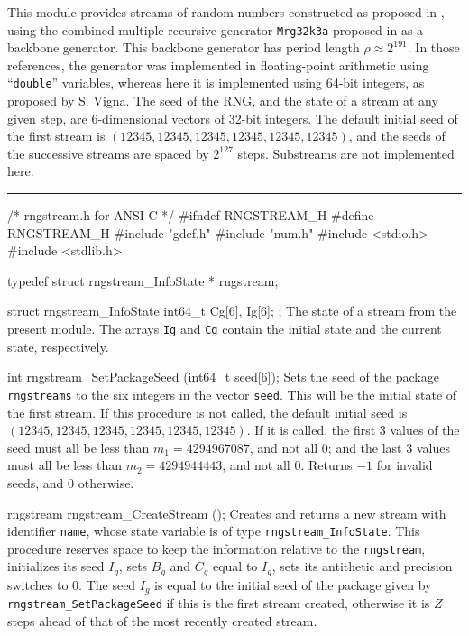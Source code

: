 
This module provides streams of random numbers constructed as proposed in \cite{rLEC02a},
using the combined multiple recursive generator {\tt Mrg32k3a} proposed in \cite{rLEC99b}
as a backbone generator.  This backbone generator has period length $\rho\approx 2^{191}$.
In those references, the generator was implemented in floating-point arithmetic
using ``\texttt{double}'' variables, whereas here it is implemented using 64-bit integers,
as proposed by S. Vigna.
The seed of the RNG, and the state of a stream at any given step,
are 6-dimensional vectors of 32-bit integers.
The default initial seed of the first stream is 
$(12345, 12345, 12345, 12345, 12345, 12345)$,
and the seeds of the successive streams are spaced by $2^{127}$ steps.
Substreams are not implemented here.


\bigskip\hrule

\code\hide
/* rngstream.h for ANSI C */
#ifndef RNGSTREAM_H
#define RNGSTREAM_H
\endhide
#include "gdef.h"
#include "num.h"
#include <stdio.h>
#include <stdlib.h>

typedef struct rngstream_InfoState * rngstream;

struct rngstream_InfoState {
   int64_t Cg[6], Ig[6];
};
\endcode
 \tab
   The state of a stream from the present module.
   The arrays {\tt Ig} and {\tt Cg} contain the initial state
   and the current state, respectively.
 \endtab
\code

int rngstream_SetPackageSeed (int64_t seed[6]);
\endcode
  \tab  Sets the seed of the package {\tt rngstreams} to the 
   six integers in the vector {\tt seed}.
   This will be the initial state of the first stream.
   If this procedure is not called, the default initial seed
   is $(12345, 12345, 12345, 12345, 12345, 12345)$.
   If it is called, the first 3 values of the seed must all be
   less than $m_1 = 4294967087$, and not all 0;
   and the last 3 values 
   must all be less than $m_2 = 4294944443$, and not all 0.
   Returns $-1$ for invalid seeds, and 0 otherwise.
 \endtab
\code

rngstream rngstream_CreateStream ();
\endcode
 \tab Creates and returns a new stream with identifier {\tt name},
   whose state variable is of type {\tt rngstream\_InfoState}.
   This procedure reserves space to keep the information relative to
   the {\tt rngstream}, initializes its seed $I_g$,
   sets $B_g$ and $C_g$ equal to $I_g$, sets its antithetic and precision
   switches to 0.
   The seed $I_g$ is equal to the initial seed of the package given by 
   {\tt rngstream\_SetPackageSeed} if this is the first stream created,
   otherwise it is $Z$ steps ahead of that of the most recently
   created stream.
 \endtab
\code

